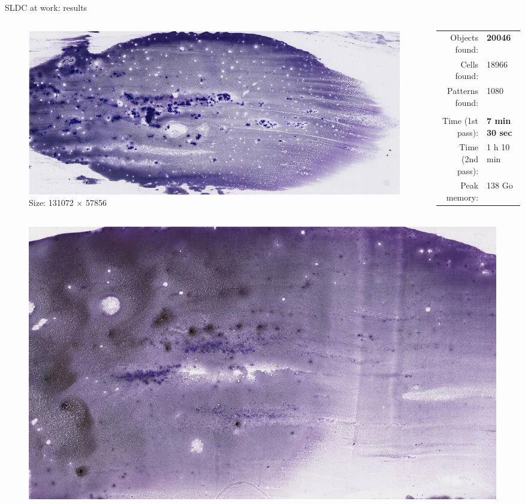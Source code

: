 \documentclass{beamer}
\begin{document}
\begin{frame}{SLDC at work: results}
	\footnotesize
	\vspace*{-0.2cm}
	\begin{columns}
		\begin{column}{0.40\linewidth}
			\begin{figure}
				\center
				\includegraphics[scale=0.2]{images/728725.png}
				\caption{Size: 131072 $\times$ 57856}
			\end{figure}
		\end{column}
		\begin{column}{0.47\linewidth}
			\begin{tabular}{rl}
				Objects found: & \textbf{20046} \\
				Cells found: & 18966 \\
				Patterns found: & 1080 \\
				& \\
				Time (1st pass): & \textbf{7 min 30 sec} \\
				Time (2nd pass): & 1 h 10 min  \\
				Peak memory: & 138 Go \\
			\end{tabular}
		\end{column}
	\end{columns}
	\begin{columns}
		\begin{column}{0.40\linewidth}
			\begin{figure}
				\center
				\includegraphics[scale=0.16]{images/716528.png}

\end{figure}
\end{column}
\end{columns}
\end{frame}
\end{document}
